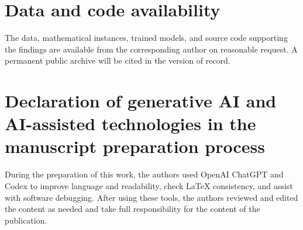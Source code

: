 \documentclass[final,5p,times,twocolumn]{elsarticle}
\begin{document}
\section*{Data and code availability}
The data, mathematical instances, trained models, and source code supporting
the findings are available from the corresponding author on reasonable
request. A permanent public archive will be cited in the version of record.

\section*{Declaration of generative AI and AI-assisted technologies in the manuscript preparation process}
During the preparation of this work, the authors used OpenAI ChatGPT and Codex
to improve language and readability, check LaTeX consistency, and assist with
software debugging. After using these tools, the authors reviewed and edited
the content as needed and take full responsibility for the content of the
publication.
\end{document}
